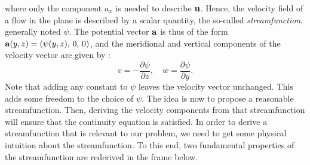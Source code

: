 where only the component $a_x$ is needed to describe $\mathbf u$. Hence, the velocity field of a flow in the plane is described by a scalar quantity, the so-called \textit{streamfunction}, generally noted $\psi$. The potential vector $\mathbf a$ is thus of the form $\mathbf a(y,z) = (\psi(y,z),\, 0,\, 0)$, and the meridional and vertical components of the velocity vector are given by :
\begin{equation} \label{eq:u-psi}
	v = -\frac{\partial \psi}{\partial z}, \quad w = \frac{\partial \psi}{\partial y}.
\end{equation}
Note that adding any constant to $\psi$ leaves the velocity vector unchanged. This adds some freedom to the choice of $\psi$. The idea is now to propose a reasonable streamfunction. Then, deriving the velocity components from that streamfunction will ensure that the continuity equation is satisfied. In order to derive a streamfunction that is relevant to our problem, we need to get some physical intuition about the streamfunction. To this end, two fundamental properties of the streamfunction are rederived in the frame below. 

